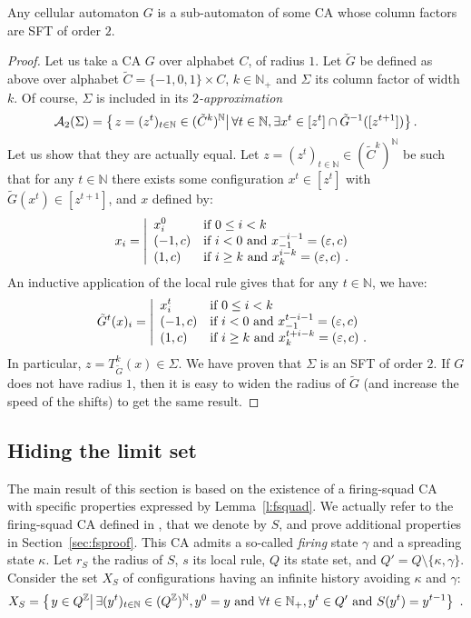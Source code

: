 \documentclass{jac}
\let\dfn\emph
\newcommand{\Z}{\mathbb Z}
\newcommand{\N}{\mathbb N}
\newcommand{\Ns}{\N_+}
\newcommand{\sett}[2]{\left\{\left.#1\vphantom{#2}\right|#2\right\}}
\newcommand{\set}[3]{\sett{#1\in#2}{#3}}
\newcommand{\soit}[1]{\left|\everymath{\displaystyle\everymath{}}\begin{array}{ll}#1\end{array}\right.}
\theoremstyle{definition}
\begin{document}
\begin{thm}\label{t:trsft}
Any cellular automaton $G$ is a sub-automaton of some CA whose column factors are SFT of order $2$.
\end{thm}
\begin{proof}
Let us take a CA $G$ over alphabet $C$, of radius $1$.
Let $\tilde G$ be defined as above over alphabet $\tilde C=\{-1,0,1\}\times C$, $k\in\Ns$ and $\Sigma$ its column factor of width $k$.
Of course, $\Sigma$ is included in its \dfn{$2$-approximation} \[\kaprx2(\Sigma)=\set{z=(z^t)_{t\in\N}}{(\tilde C^k)^\N}{\forall t\in\N,\exists x^t\in[z^t]\cap\tilde G^{-1}([z^{t+1}])}.\]
Let us show that they are actually equal. Let $z=(z^t)_{t\in\N}\in(\tilde C^k)^\N$ be such that for any $t\in\N$ there exists some configuration $x^t\in[z^t]$ with $\tilde G(x^t)\in[z^{t+1}]$, and $x$ defined by:
\[
x_i=\soit{x^0_i&\textrm{if }0\le i<k\\(-1,c)&\textrm{if }i<0\textrm{ and }x^{-i-1}_{-1}=(\varepsilon,c)\\(1,c)&\textrm{if }i\ge k\textrm{ and }x^{i-k}_k=(\varepsilon,c)~.}
\]
An inductive application of the local rule gives that for any $t\in\N$, we have:
\[
\tilde G^t(x)_i=\soit{x^t_i&\textrm{if }0\le i<k\\(-1,c)&\textrm{if }i<0\textrm{ and }x^{t-i-1}_{-1}=(\varepsilon,c)\\(1,c)&\textrm{if }i\ge k\textrm{ and }x^{t+i-k}_k=(\varepsilon,c)~.}
\]
In particular, $z=T_{\tilde G}^k(x)\in\Sigma$.
We have proven that $\Sigma$ is an SFT of order $2$.
If $G$ does not have radius $1$, then it is easy to widen the radius of $\tilde G$ (and increase the speed of the shifts) to get the same result.
\end{proof}


\subsection{Hiding the limit set}

The main result of this section is based on the existence of a firing-squad CA with specific properties expressed by Lemma~\ref{l:fsquad}. We actually refer to the
firing-squad CA defined in \cite{rice}, that we denote by $S$,
and prove additional properties in Section~\ref{sec:fsproof}.
This CA admits a so-called \dfn{firing} state $\gamma$ and a spreading state $\kappa$. Let $r_S$ the radius of $S$, $s$ its local rule, $Q$ its state set, and $Q'=Q\setminus\{\kappa,\gamma\}$.
Consider the set $X_S$ of configurations having an infinite history avoiding $\kappa$ and $\gamma$:
\[X_S = \set y{Q^\Z}{\exists (y^t)_{t\in\N}\in(Q^\Z)^\N, y^0=y\text{ and }\forall t\in\Ns,y^t\in Q'\text{ and }S(y^t)=y^{t-1}}~.\]
\end{document}

